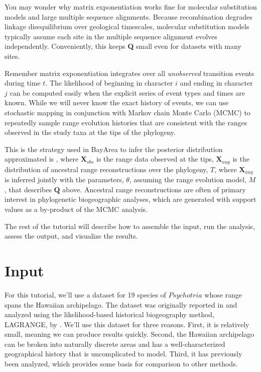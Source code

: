 \documentclass[11pt]{article}
\begin{document}
You may wonder why matrix exponentiation works fine for molecular substitution models and large multiple sequence alignments.
Because recombination degrades linkage disequilibrium over geological timescales, molecular substitution models typically assume each site in the multiple sequence alignment evolves independently.
Conveniently, this keeps \textbf{Q} small even for datasets with many sites.

Remember matrix exponentiation integrates over all \textit{unobserved} transition events during time $t$.
The likelihood of beginning in character $i$ and ending in character $j$ can be computed easily when the explicit series of event types and times are known.
While we will never know the exact history of events, we can use stochastic mapping in conjunction with Markov chain Monte Carlo (MCMC) to repeatedly sample range evolution histories that are consistent with the ranges observed in the study taxa at the tips of the phylogeny.

This is the strategy used in BayArea to infer the posterior distribution approximated is 
, where $\textbf{X}_{obs}$ is the range data observed at the tips, $\textbf{X}_{aug}$ is the distribution of ancestral range reconstructions over the phylogeny, $T$, where $\textbf{X}_{aug}$ is inferred jointly with the parameters, $\theta$, assuming the range evolution model, $M$, that describes $\textbf{Q}$ above.
Ancestral range reconstructions are often of primary interest in phylogenetic biogeographic analyses, which are generated with support values as a by-product of the MCMC analysis.

The rest of the tutorial will describe how to assemble the input, run the analysis, assess the output, and visualize the results.

\newpage

\section{Input}

For this tutorial, we'll use a dataset for 19 species of $Psychotria$ whose range spans the Hawaiian archipelago.
The dataset was originally reported in \citet{nepokroeff03} and analyzed using the likelihood-based historical biogeography method, LAGRANGE, by \citet{ree08}.
We'll use this dataset for three reasons.
First, it is relatively small, meaning we can produce results quickly.
Second, the Hawaiian archipelago can be broken into naturally discrete areas and has a well-characterized geographical history that is uncomplicated to model.
Third, it has previously been analyzed, which provides some basis for comparison to other methods.
\end{document}
